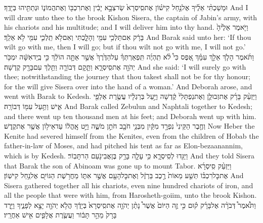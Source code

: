{וּמָשַׁכְתִּ֨י אֵלֶ֜יךָ אֶל\maqqaf נַ֣חַל קִישׁ֗וֹן אֶת\maqqaf סִֽיסְרָא֙ שַׂר\maqqaf צְבָ֣א יָבִ֔ין וְאֶת\maqqaf רִכְבּ֖וֹ וְאֶת\maqqaf הֲמוֹנ֑וֹ וּנְתַתִּ֖יהוּ בְּיָדֶֽךָ׃}
{And I will draw unto thee to the brook Kishon Sisera, the captain of Jabin’s army, with his chariots and his multitude; and I will deliver him into thy hand.}
{וַיֹּ֤אמֶר אֵלֶ֙יהָ֙ בָּרָ֔ק אִם\maqqaf תֵּלְכִ֥י עִמִּ֖י וְהָלָ֑כְתִּי וְאִם\maqqaf לֹ֥א תֵֽלְכִ֛י עִמִּ֖י לֹ֥א אֵלֵֽךְ׃}
{And Barak said unto her: ‘If thou wilt go with me, then I will go; but if thou wilt not go with me, I will not go.’}
{וַתֹּ֜אמֶר הָלֹ֧ךְ אֵלֵ֣ךְ עִמָּ֗ךְ אֶ֚פֶס כִּי֩ לֹ֨א תִֽהְיֶ֜ה תִּֽפְאַרְתְּךָ֗ עַל\maqqaf הַדֶּ֙רֶךְ֙ אֲשֶׁ֣ר אַתָּ֣ה הוֹלֵ֔ךְ כִּ֣י בְֽיַד\maqqaf אִשָּׁ֔ה יִמְכֹּ֥ר יְהֹוָ֖ה אֶת\maqqaf סִֽיסְרָ֑א וַתָּ֧קׇם דְּבוֹרָ֛ה וַתֵּ֥לֶךְ עִם\maqqaf בָּרָ֖ק קֶֽדְשָׁה׃}
{And she said: ‘I will surely go with thee; notwithstanding the journey that thou takest shall not be for thy honour; for the \lord\space will give Sisera over into the hand of a woman.’ And Deborah arose, and went with Barak to Kedesh.}
{וַיַּזְעֵ֨ק בָּרָ֜ק אֶת\maqqaf זְבוּלֻ֤ן וְאֶת\maqqaf נַפְתָּלִי֙ קֶ֔דְשָׁה וַיַּ֣עַל בְּרַגְלָ֔יו עֲשֶׂ֥רֶת אַלְפֵ֖י אִ֑ישׁ וַתַּ֥עַל עִמּ֖וֹ דְּבוֹרָֽה׃}
{And Barak called Zebulun and Naphtali together to Kedesh; and there went up ten thousand men at his feet; and Deborah went up with him.}
{וְחֶ֤בֶר הַקֵּינִי֙ נִפְרָ֣ד מִקַּ֔יִן מִבְּנֵ֥י חֹבָ֖ב חֹתֵ֣ן מֹשֶׁ֑ה וַיֵּ֣ט אׇֽהֳל֔וֹ עַד\maqqaf אֵיל֥וֹן  אֲשֶׁ֥ר אֶת\maqqaf קֶֽדֶשׁ׃}
{Now Heber the Kenite had severed himself from the Kenites, even from the children of Hobab the father-in-law of Moses, and had pitched his tent as far as Elon-bezaanannim, which is by Kedesh.}
{וַיַּגִּ֖דוּ לְסִֽיסְרָ֑א כִּ֥י עָלָ֛ה בָּרָ֥ק בֶּן\maqqaf אֲבִינֹ֖עַם הַר\maqqaf תָּבֽוֹר׃}
{And they told Sisera that Barak the son of Abinoam was gone up to mount Tabor.}
{וַיַּזְעֵ֨ק סִֽיסְרָ֜א אֶת\maqqaf כׇּל\maqqaf רִכְבּ֗וֹ תְּשַׁ֤ע מֵאוֹת֙ רֶ֣כֶב בַּרְזֶ֔ל וְאֶת\maqqaf כׇּל\maqqaf הָעָ֖ם אֲשֶׁ֣ר אִתּ֑וֹ מֵחֲרֹ֥שֶׁת הַגּוֹיִ֖ם אֶל\maqqaf נַ֥חַל קִישֽׁוֹן׃}
{And Sisera gathered together all his chariots, even nine hundred chariots of iron, and all the people that were with him, from Harosheth-goiim, unto the brook Kishon.}
{וַתֹּ֩אמֶר֩ דְּבֹרָ֨ה אֶל\maqqaf בָּרָ֜ק ק֗וּם כִּ֣י זֶ֤ה הַיּוֹם֙ אֲשֶׁר֩ נָתַ֨ן יְהֹוָ֤ה אֶת\maqqaf סִֽיסְרָא֙ בְּיָדֶ֔ךָ הֲלֹ֥א יְהֹוָ֖ה יָצָ֣א לְפָנֶ֑יךָ וַיֵּ֤רֶד בָּרָק֙ מֵהַ֣ר תָּב֔וֹר וַעֲשֶׂ֧רֶת אֲלָפִ֛ים אִ֖ישׁ אַחֲרָֽיו׃}
